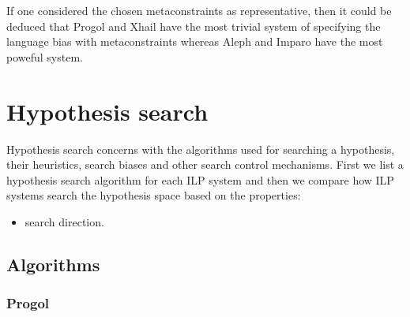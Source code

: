 If one considered the chosen metaconstraints as representative, then it could be deduced that Progol and Xhail have the most trivial system of specifying the language bias with metaconstraints whereas Aleph and Imparo have the most poweful system.

\section{Hypothesis search}
Hypothesis search concerns with the algorithms used for searching a hypothesis, their heuristics, search biases and other search control mechanisms.
First we list a hypothesis search algorithm for each ILP system and then 
we compare how ILP systems search the hypothesis space based on the properties:
\begin{itemize}
\item search direction.
\end{itemize}

\subsection{Algorithms}

\subsubsection{Progol}


